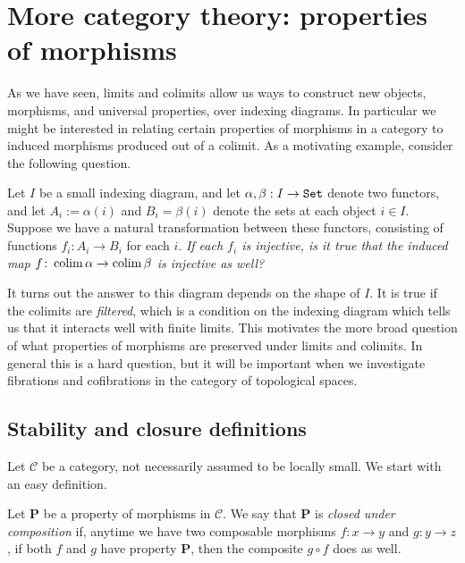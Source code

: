 
\section{More category theory: properties of morphisms}

As we have seen, limits and colimits allow us ways to construct new objects, morphisms, and universal properties, over indexing diagrams. In particular we might be interested in relating certain properties of morphisms in a category to induced morphisms produced out of a colimit. As a motivating example, consider the following question.

\begin{question} Let $I$ be a small indexing diagram, and let $\alpha,\beta: I \to \texttt{Set}$ denote two functors, and let $A_i := \alpha(i)$ and $B_i = \beta(i)$ denote the sets at each object $i\in I$. Suppose we have a natural transformation between these functors, consisting of functions $f_i \colon A_i \to B_i$ for each $i$. \textit{If each $f_i$ is injective, is it true that the induced map $f\colon \mathop{\operatorname*{colim}} \alpha \to \mathop{\operatorname*{colim}} \beta$ is injective as well?}
\end{question}

It turns out the answer to this diagram depends on the shape of $I$. It is true if the colimits are \textit{filtered}, which is a condition on the indexing diagram which tells us that it interacts well with finite limits. This motivates the more broad question of what properties of morphisms are preserved under limits and colimits. In general this is a hard question, but it will be important when we investigate fibrations and cofibrations in the category of topological spaces.


\subsection{Stability and closure definitions}



Let $\mathscr{C}$ be a category, not necessarily assumed to be locally small. We start with an easy definition.

\begin{definition}\label{def:closed-under-pullback} Let \textbf{P} be a property of morphisms in $\mathscr{C}$. We say that \textbf{P} is \textit{closed under composition} if, anytime we have two composable morphisms $f: x \to y$ and $g: y \to z$, if both $f$ and $g$ have property \textbf{P}, then the composite $g\circ f$ does as well.
\end{definition}


